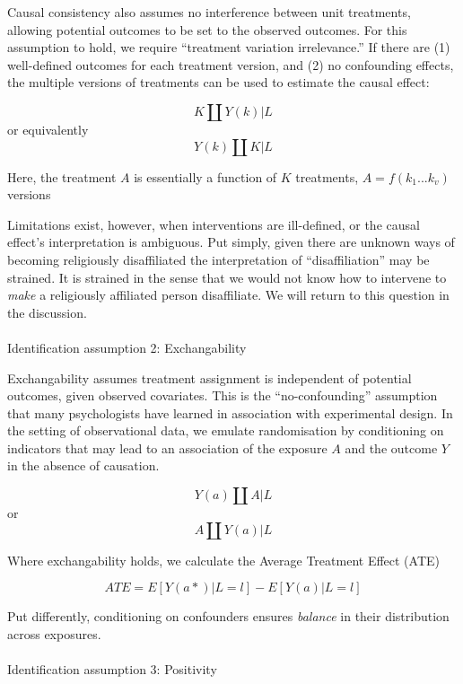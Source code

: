 \documentclass[
  singlecolumn,
  9pt]{article}
\makeatletter
\let\oldparagraph\paragraph
\renewcommand{\paragraph}{
    \@ifstar
      \xxxParagraphStar
      \xxxParagraphNoStar
  }
\newcommand{\xxxParagraphStar}[1]{\oldparagraph*{#1}\mbox{}}
\newcommand{\xxxParagraphNoStar}[1]{\oldparagraph{#1}\mbox{}}
\makeatother
\begin{document}
Causal consistency also assumes no interference between unit treatments,
allowing potential outcomes to be set to the observed outcomes. For this
assumption to hold, we require ``treatment variation irrelevance.'' If
there are (1) well-defined outcomes for each treatment version, and (2)
no confounding effects, the multiple versions of treatments can be used
to estimate the causal effect:

\[K \coprod Y(k) | L\] or equivalently \[Y(k) \coprod K | L\]

Here, the treatment \(A\) is essentially a function of \(K\) treatments,
\(A = f(k_1...k_v)\) versions

Limitations exist, however, when interventions are ill-defined, or the
causal effect's interpretation is ambiguous. Put simply, given there are
unknown ways of becoming religiously disaffiliated the interpretation of
``disaffiliation'' may be strained. It is strained in the sense that we
would not know how to intervene to \emph{make} a religiously affiliated
person disaffiliate. We will return to this question in the discussion.

\paragraph{Identification assumption 2:
Exchangability}\label{identification-assumption-2-exchangability}

Exchangability assumes treatment assignment is independent of potential
outcomes, given observed covariates. This is the ``no-confounding''
assumption that many psychologists have learned in association with
experimental design. In the setting of observational data, we emulate
randomisation by conditioning on indicators that may lead to an
association of the exposure \(A\) and the outcome \(Y\) in the absence
of causation.

\[Y(a)\coprod  A|L\] or \[A \coprod  Y(a)|L\]

Where exchangability holds, we calculate the Average Treatment Effect
(ATE)

\[
ATE = E[Y(a*)|L = l] - E[Y(a)|L = l] 
\]

Put differently, conditioning on confounders ensures \emph{balance} in
their distribution across exposures.

\paragraph{Identification assumption 3:
Positivity}\label{identification-assumption-3-positivity}
\end{document}
